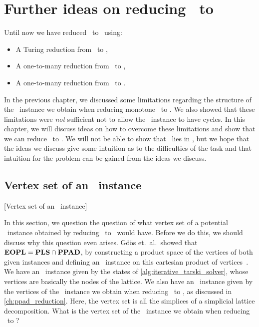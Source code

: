 \setchapterpreamble[u]{\margintoc}
\chapter{Further ideas on reducing \Tarski\ to \EOPL}\label{ch:further_ideas}

Until now we have reduced \Tarski\ to \EndOfLine\ using:
\begin{itemize}
	\item A Turing reduction from \Tarski\ to \Tarskistar,
	\item A one-to-many reduction from \Tarskistar\ to \Sperner,
	\item A one-to-many reduction from \Sperner\ to \EndOfLine.
\end{itemize}
In the previous chapter, we discussed some limitations regarding the structure of the \Sperner\ instance we obtain when reducing monotone \Tarskistar\ to \Sperner. We also showed that these limitations were \emph{not} sufficient not to allow the \EndOfLine\ instance to have cycles. In this chapter, we will discuss ideas on how to overcome these limitations and show that we can reduce \Tarski\ to \EndOfPotentialLine\@. We will not be able to show that \Tarski\ lies in \EOPL, but we hope that the ideas we discuss give some intuition as to the difficulties of the task and that intuition for the problem can be gained from the ideas we discuss.

\section{Vertex set of an \EOPL\ instance}[Vertex set of an \EOPL\ instance]

In this section, we question the question of what vertex set of a potential \EOPL\ instance obtained by reducing \Tarskistar\ to \EndOfPotentialLine\ would have. Before we do this, we should discuss why this question even arises. Göös et.\ al.\ showed that $\textbf{EOPL} = \textbf{PLS} \cap \textbf{PPAD}$, by constructing a product space of the vertices of both given instances and defining an \EndOfPotentialLine\ instance on this cartesian product of vertices~. We have an \Localopt\ instance given by the states of \cref{alg:iterative_tarski_solver}, whose vertices are basically the nodes of the lattice. We also have an \EndOfLine\ instance given by the vertices of the \Sperner\ instance we obtain when reducing \Tarskistar\ to \Sperner, as discussed in \cref{ch:ppad_reduction}. Here, the vertex set is all the simplices of a simplicial lattice decomposition. What is the vertex set of the \EndOfPotentialLine\ instance we obtain when reducing \Tarskistar\ to \EndOfLine\@?

